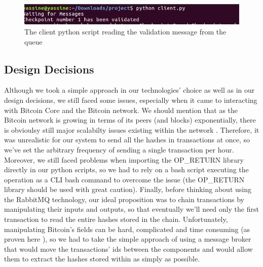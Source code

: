 \begin{figure}[htp]
    \centering
    \includegraphics[scale=0.42]{out}
    \caption{The client python script reading the validation message from the queue}
\end{figure}
\subsection{Design Decisions}
Although we took a simple approach in our technologies' choice as well as in our design decisions, we still faced some issues, especially when it came to interacting with Bitcoin Core and the Bitcoin network. We should mention that as the Bitcoin network is growing in terms of its peers (and blocks) exponentially, there is obvioulsy still major scalabilty issues existing within the network \cite{scale}. Therefore, it was unrealistic for our system to send all the hashes in transactions at once, so we've set the arbitrary frequency of sending a single transaction per hour. Moreover, we still faced problems when importing the OP\_RETURN library directly in our python scripts, so we had to rely on a bash script executing the operation as a CLI bash command to overcome the issue (the OP\_RETURN library should be used with great caution). Finally, before thinking about using the RabbitMQ technology, our ideal proposition was to chain transactions by manipulating their inputs and outputs, so that eventually we'll need only the first transaction to read the entire hashes stored in the chain. Unfortunately, manipulating Bitcoin's fields can be hard, complicated and time consuming (as proven here \cite{hard}), so we had to take the simple approach of using a message broker that would move the transactions' ids between the components and would allow them to extract the hashes stored within as simply as possible.
\newpage
